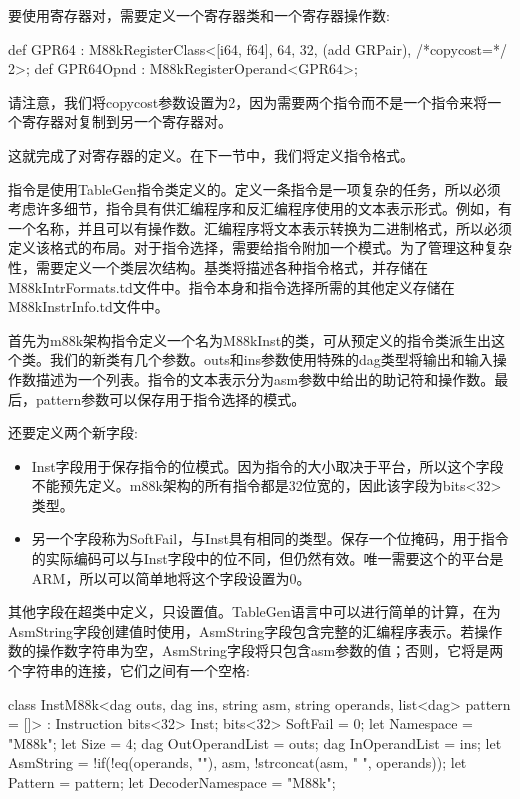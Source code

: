 要使用寄存器对，需要定义一个寄存器类和一个寄存器操作数:

\begin{cpp}
def GPR64 : M88kRegisterClass<[i64, f64], 64, 32,
                              (add GRPair), /*copycost=*/ 2>;
def GPR64Opnd : M88kRegisterOperand<GPR64>;
\end{cpp}

请注意，我们将copycost参数设置为2，因为需要两个指令而不是一个指令来将一个寄存器对复制到另一个寄存器对。

这就完成了对寄存器的定义。在下一节中，我们将定义指令格式。


指令是使用TableGen指令类定义的。定义一条指令是一项复杂的任务，所以必须考虑许多细节，指令具有供汇编程序和反汇编程序使用的文本表示形式。例如，有一个名称，并且可以有操作数。汇编程序将文本表示转换为二进制格式，所以必须定义该格式的布局。对于指令选择，需要给指令附加一个模式。为了管理这种复杂性，需要定义一个类层次结构。基类将描述各种指令格式，并存储在M88kIntrFormats.td文件中。指令本身和指令选择所需的其他定义存储在M88kInstrInfo.td文件中。

首先为m88k架构指令定义一个名为M88kInst的类，可从预定义的指令类派生出这个类。我们的新类有几个参数。outs和ins参数使用特殊的dag类型将输出和输入操作数描述为一个列表。指令的文本表示分为asm参数中给出的助记符和操作数。最后，pattern参数可以保存用于指令选择的模式。

还要定义两个新字段:

\begin{itemize}
\item
Inst字段用于保存指令的位模式。因为指令的大小取决于平台，所以这个字段不能预先定义。m88k架构的所有指令都是32位宽的，因此该字段为bits<32>类型。

\item
另一个字段称为SoftFail，与Inst具有相同的类型。保存一个位掩码，用于指令的实际编码可以与Inst字段中的位不同，但仍然有效。唯一需要这个的平台是ARM，所以可以简单地将这个字段设置为0。
\end{itemize}

其他字段在超类中定义，只设置值。TableGen语言中可以进行简单的计算，在为AsmString字段创建值时使用，AsmString字段包含完整的汇编程序表示。若操作数的操作数字符串为空，AsmString字段将只包含asm参数的值；否则，它将是两个字符串的连接，它们之间有一个空格:

\begin{cpp}
class InstM88k<dag outs, dag ins, string asm, string operands,
                list<dag> pattern = []>
    : Instruction {
    bits<32> Inst;
    bits<32> SoftFail = 0;
    let Namespace = "M88k";
    let Size = 4;
    dag OutOperandList = outs;
    dag InOperandList = ins;
    let AsmString = !if(!eq(operands, ""), asm,
                        !strconcat(asm, " ", operands));
    let Pattern = pattern;
    let DecoderNamespace = "M88k";
}
\end{cpp}


